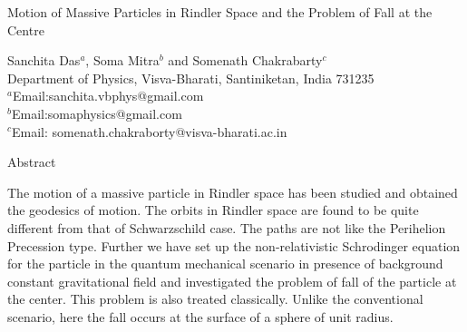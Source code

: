 \documentclass[12pt]{article}
\begin{document}
\begin{center}
Motion of Massive Particles in Rindler Space and the Problem of
Fall at the Centre

\medskip
Sanchita Das$^a$, Soma Mitra$^b$ and Somenath Chakrabarty$^c$ \\
Department of Physics, Visva-Bharati, Santiniketan, India 731235 \\
$^a$Email:sanchita.vbphys@gmail.com\\
$^b$Email:somaphysics@gmail.com\\
$^c$Email: somenath.chakraborty@visva-bharati.ac.in
\end{center}

\medskip
\begin{center}
Abstract
\end{center}
The motion of a massive particle in Rindler space has been studied 
and obtained the geodesics of motion. The orbits in Rindler space are
found to be quite different from that of Schwarzschild case. The paths
are not like the Perihelion Precession type. Further we have
set up the non-relativistic Schrodinger equation for the particle in the
quantum mechanical scenario in presence of background constant gravitational field and
investigated the problem of fall of the particle at the center.  This
problem is also treated classically. Unlike the conventional scenario,
here the fall occurs at the surface of a sphere of unit radius.
\end{document}
